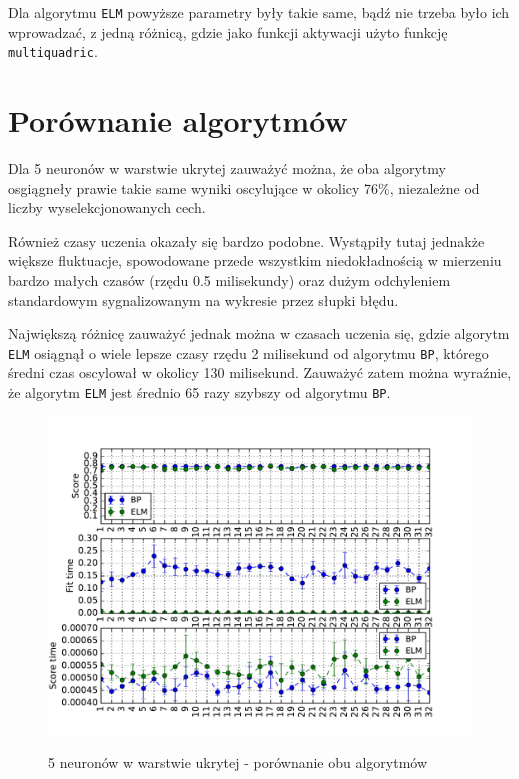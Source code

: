 Dla algorytmu \texttt{ELM} powyższe parametry były takie same, bądź nie trzeba było ich wprowadzać, z jedną różnicą, gdzie jako funkcji aktywacji użyto funkcję \texttt{multiquadric}.

\newpage

\section{Porównanie algorytmów}

Dla 5 neuronów w warstwie ukrytej zauważyć można, że oba algorytmy osgiągneły prawie takie same wyniki oscylujące w okolicy 76\%, niezależne od liczby wyselekcjonowanych cech.

Również czasy uczenia okazały się bardzo podobne. Wystąpiły tutaj jednakże większe fluktuacje, spowodowane przede wszystkim niedokładnością w mierzeniu bardzo małych czasów (rzędu 0.5 milisekundy) oraz dużym odchyleniem standardowym sygnalizowanym na wykresie przez słupki błędu.

Największą różnicę zauważyć jednak można w czasach uczenia się, gdzie algorytm \texttt{ELM} osiągnął o wiele lepsze czasy rzędu 2 milisekund od algorytmu \texttt{BP}, którego średni czas oscylował w okolicy 130 milisekund. Zauważyć zatem można wyraźnie, że algorytm \texttt{ELM} jest średnio 65 razy szybszy od algorytmu \texttt{BP}.

\begin{figure}[h!]
	\centering
	\includegraphics[width=1.0\linewidth]{img/bp_elm_5.pdf}
	\label{Rysunek}
	\caption{5 neuronów w warstwie ukrytej - porównanie obu algorytmów}
\end{figure}

